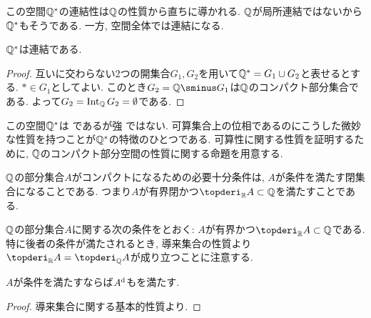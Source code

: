 \documentclass[uplatex, dvipdfmx, a4paper, 12pt]{jsarticle}
\theoremstyle{plain}
\theoremstyle{nonumberplain}
\newtheorem{proof}{証明}
\begin{document}
この空間$ \mathbb{Q}^\ast $の連結性は$ \mathbb{Q} $の性質から直ちに導かれる. $ \mathbb{Q} $が局所連結ではないから$ \mathbb{Q}^\ast $もそうである. 一方, 空間全体では連結になる.

\begin{property}
	$ \mathbb{Q}^\ast $は連結である.
\end{property}
\begin{proof}
	互いに交わらない2つの開集合$ G_1, G_2 $を用いて$ \mathbb{Q}^\ast = G_1 \cup G_2 $と表せるとする. $ \ast \in G_1 $としてよい. このとき$ G_2 =\Q \sminus G_1 $は$ \mathbb{Q} $のコンパクト部分集合である. よって$ G_2 = \mathop{\mathrm{Int}}\nolimits_{\mathbb{Q}} G_2 = \emptyset $である.
\end{proof}

この空間$ \mathbb{Q}^\ast $は \Frechet であるが強 \Frechet ではない. 可算集合上の位相であるのにこうした微妙な性質を持つことが$ \mathbb{Q}^\ast $の特徴のひとつである. 可算性に関する性質を証明するために, $ \mathbb{Q} $のコンパクト部分空間の性質に関する命題を用意する.

\begin{proposition}
	$ \mathbb{Q} $の部分集合$ A $がコンパクトになるための必要十分条件は, $ A $が条件を満たす閉集合になることである. つまり$ A $が有界閉かつ$ \topderi_{\R} A \subset \Q $を満たすことである.
\end{proposition}

$ \mathbb{Q} $の部分集合$ A $に関する次の条件をとおく: $ A $が有界かつ$ \topderi_{\R} A \subset \Q $である. 特に後者の条件が満たされるとき, 導来集合の性質より$ \topderi_{\R} A = \topderi_{\Q} A $が成り立つことに注意する.
\begin{lemma}
	$ A $が条件を満たすならば$ A^{\mathrm{d}} $もを満たす.
\end{lemma}
\begin{proof}
	導来集合に関する基本的性質より.
\end{proof}
\end{document}
